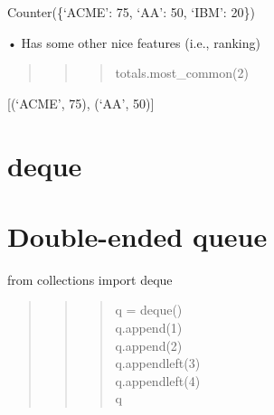 \documentclass[
  letterpaper,
  DIV=11,
  numbers=noendperiod]{scrreprt}
\begin{document}
Counter(\{`ACME': 75, `AA': 50, `IBM': 20\})

\begin{quote}
\begin{quote}
\begin{quote}
\end{quote}
\end{quote}
\end{quote}

• Has some other nice features (i.e., ranking)

\begin{quote}
\begin{quote}
\begin{quote}
totals.most\_common(2)
\end{quote}
\end{quote}
\end{quote}

{[}(`ACME', 75), (`AA', 50){]}

\begin{quote}
\begin{quote}
\begin{quote}
\end{quote}
\end{quote}
\end{quote}


\chapter{deque}\label{deque}


\chapter{Double-ended queue}\label{double-ended-queue}

from collections import deque

\begin{quote}
\begin{quote}
\begin{quote}
q = deque()\\
q.append(1)\\
q.append(2)\\
q.appendleft(3)\\
q.appendleft(4)\\
q
\end{quote}
\end{quote}
\end{quote}
\end{document}
